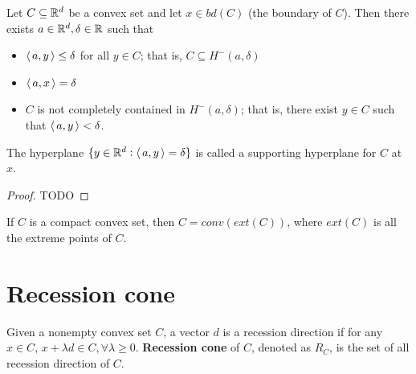 \begin{refsection}
\begin{theorem}
	Let $C\subseteq \mathbb{R}^d$ be a convex set and let $x\in bd(C)$ (the boundary of $C$). Then there exists $a\in\mathbb{R}^d, \delta\in \mathbb{R}$ such that 
	\begin{itemize}
	\item ${\left< \, a,y \, \right>}\leq \delta$ for all $y\in C$; that is, $C\subseteq H^-(a,\delta)$
	\item ${\left< \, a,x \, \right>} = \delta$
	\item $C$ is not completely contained in $H^-(a,\delta)$; that is, there exist $y\in C$ such that ${\left< \, a,y \, \right>}<\delta$.
	\end{itemize}
The hyperplane $\{y\in \mathbb{R}^d:{\left< \, a,y \, \right>} = \delta\}$ is called a supporting hyperplane for $C$ at $x$.
\end{theorem}
\begin{proof}
TODO	
\end{proof}



\begin{theorem} If $C$ is a compact convex set, then $C = conv(ext(C))$, where $ext(C)$ is all the extreme points of $C$. 
\end{theorem}



\section{Recession cone}
\begin{definition}
	Given a nonempty convex set $C$, a vector $d$ is a recession direction if for any $x\in C$, $x+\lambda d \in C,\forall \lambda \geq 0$.
	\textbf{Recession cone} of $C$, denoted as $R_C$, is the set of all recession direction of $C$.
\end{definition}


\end{refsection}
